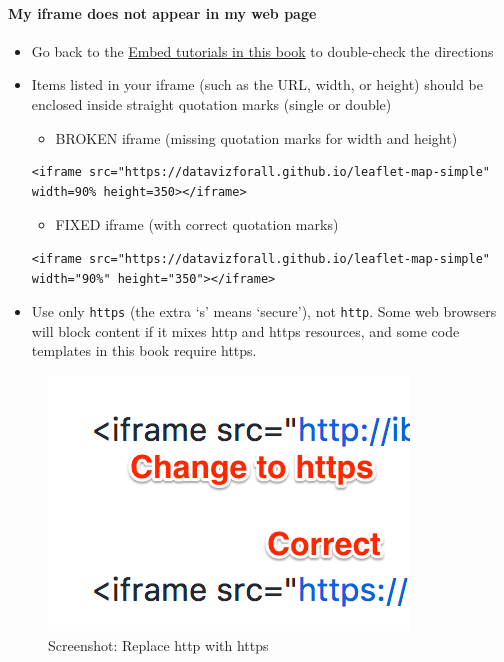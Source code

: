 \documentclass[
  english,
]{book}
\providecommand{\tightlist}{%
  \setlength{\itemsep}{0pt}\setlength{\parskip}{0pt}}
\begin{document}
\hypertarget{my-iframe-does-not-appear-in-my-web-page}{%
\paragraph{My iframe does not appear in my web page}\label{my-iframe-does-not-appear-in-my-web-page}}

\begin{itemize}
\tightlist
\item
  Go back to the \href{embed}{Embed tutorials in this book} to double-check the directions
\item
  Items listed in your iframe (such as the URL, width, or height) should be enclosed inside straight quotation marks (single or double)

  \begin{itemize}
  \tightlist
  \item
    BROKEN iframe (missing quotation marks for width and height)
  \end{itemize}

\begin{verbatim}
<iframe src="https://datavizforall.github.io/leaflet-map-simple" width=90% height=350></iframe>
\end{verbatim}

  \begin{itemize}
  \tightlist
  \item
    FIXED iframe (with correct quotation marks)
  \end{itemize}

\begin{verbatim}
<iframe src="https://datavizforall.github.io/leaflet-map-simple" width="90%" height="350"></iframe>
\end{verbatim}
\item
  Use only \texttt{https} (the extra `s' means `secure'), not \texttt{http}. Some web browsers will block content if it mixes http and https resources, and some code templates in this book require https.
\end{itemize}

\begin{figure}
\centering
\includegraphics{images/08-github/http-vs-https.png}
\caption{Screenshot: Replace http with https}
\end{figure}
\end{document}
